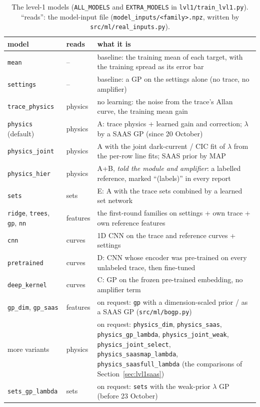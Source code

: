 \documentclass[10pt]{article}
\newcommand{\code}[1]{\texttt{#1}}
\begin{document}
\begin{table}[H]
\centering\small
\begin{tabularx}{\textwidth}{>{\raggedright\arraybackslash}p{2.9cm}>{\raggedright\arraybackslash}p{1.9cm}X}
\toprule
model & reads & what it is \\
\midrule
\code{mean} & -- & baseline: the training mean of each target, with the training spread as its error bar \\
\code{settings} & -- & baseline: a GP on the settings alone (no trace, no amplifier) \\
\code{trace\_physics} & physics & no learning: the noise from the trace's Allan curve, the training mean gain \\
\code{physics} (default) & physics & A: trace physics + learned gain and correction; $\lambda$ by a SAAS GP (since 20 October) \\
\code{physics\_joint} & physics & A with the joint dark-current / CIC fit of $\lambda$ from the per-row line fits; SAAS prior by MAP \\
\code{physics\_hier} & physics & A+B, \emph{told the module and amplifier}: a labelled reference, marked ``(labels)'' in every report \\
\code{sets} & sets & E: A with the trace sets combined by a learned set network \\
\code{ridge}, \code{trees}, \code{gp}, \code{nn} & features & the first-round families on settings + own trace + own reference features \\
\code{cnn} & curves & 1D CNN on the trace and reference curves + settings \\
\code{pretrained} & curves & D: CNN whose encoder was pre-trained on every unlabeled trace, then fine-tuned \\
\code{deep\_kernel} & curves & C: GP on the frozen pre-trained embedding, no amplifier term \\
\midrule
\code{gp\_dim}, \code{gp\_saas} & features & on request: \code{gp} with a dimension-scaled prior / as a SAAS GP (\code{src/ml/bogp.py}) \\
7 more variants & physics & on request: \code{physics\_dim}, \code{physics\_saas}, \code{physics\_gp\_lambda}, \code{physics\_joint\_weak},
  \code{physics\_joint\_select}, \code{physics\_saasmap\_lambda}, \code{physics\_saasfull\_lambda} (the comparisons of Section~\ref{sec:lvl1saas}) \\
\code{sets\_gp\_lambda} & sets & on request: \code{sets} with the weak-prior $\lambda$ GP (before 23 October) \\
\bottomrule
\end{tabularx}
\caption{The level-1 models (\code{ALL\_MODELS} and \code{EXTRA\_MODELS} in \code{lvl1/train\_lvl1.py}). ``reads'': the model-input file
(\code{model\_inputs/<family>.npz}, written by \code{src/ml/real\_inputs.py}).}
\label{tab:lvl1models}
\end{table}
\end{document}
